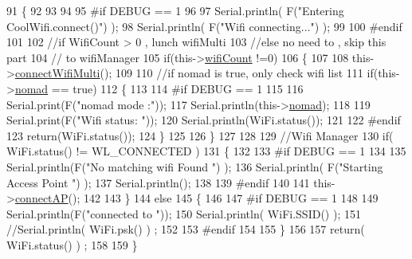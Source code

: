 \begin{DoxyCode}
91 \{       
92 
93 
94 
95 \textcolor{preprocessor}{#if DEBUG == 1 }
96 
97     Serial.println( F(\textcolor{stringliteral}{"Entering CoolWifi.connect()"}) );
98     Serial.println( F(\textcolor{stringliteral}{"Wifi connecting..."}) );
99 
100 \textcolor{preprocessor}{#endif}
101 
102     \textcolor{comment}{//if WifiCount > 0 , lunch wifiMulti}
103     \textcolor{comment}{//else no need to , skip this part}
104     \textcolor{comment}{// to wifiManager  }
105     \textcolor{keywordflow}{if}(this->\hyperlink{classCoolWifi_ab133bd92fcb895b884deecd6678592e4}{wifiCount} !=0)
106     \{
107     
108         this->\hyperlink{classCoolWifi_a419de92d738f14b7444cf822b3ab0070}{connectWifiMulti}();
109         
110         \textcolor{comment}{//if nomad is true, only check wifi list}
111         \textcolor{keywordflow}{if}(this->\hyperlink{classCoolWifi_ab7d9643c4af7bac3be331ef008b2ea27}{nomad} == \textcolor{keyword}{true})
112         \{
113     
114 \textcolor{preprocessor}{        #if DEBUG == 1}
115     
116             Serial.print(F(\textcolor{stringliteral}{"nomad mode :"}));
117             Serial.println(this->\hyperlink{classCoolWifi_ab7d9643c4af7bac3be331ef008b2ea27}{nomad});
118         
119             Serial.print(F(\textcolor{stringliteral}{"Wifi status: "}));
120             Serial.println(WiFi.status());
121         
122 \textcolor{preprocessor}{        #endif  }
123             \textcolor{keywordflow}{return}(WiFi.status());  
124         \}
125 
126     \}
127 
128 
129     \textcolor{comment}{//Wifi Manager}
130     \textcolor{keywordflow}{if}( WiFi.status() != WL\_CONNECTED ) 
131     \{
132 
133 \textcolor{preprocessor}{    #if DEBUG == 1 }
134     
135         Serial.println(F(\textcolor{stringliteral}{"No matching wifi Found "}) );
136         Serial.println( F(\textcolor{stringliteral}{"Starting Access Point "}) );  
137         Serial.println();
138 
139 \textcolor{preprocessor}{    #endif}
140         
141         this->\hyperlink{classCoolWifi_a7c857f27161782f5ef1d62d552aff971}{connectAP}();     
142         
143     \}
144     \textcolor{keywordflow}{else}
145     \{
146 
147 \textcolor{preprocessor}{    #if DEBUG == 1}
148 
149         Serial.println(F(\textcolor{stringliteral}{"connected to "}));
150         Serial.println( WiFi.SSID() );
151         \textcolor{comment}{//Serial.println( WiFi.psk() ) ;}
152                 
153 \textcolor{preprocessor}{    #endif}
154     
155     \}
156     
157     \textcolor{keywordflow}{return}( WiFi.status() ) ;
158 
159 \}
\end{DoxyCode}
